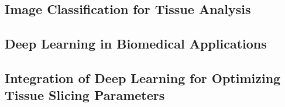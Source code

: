 
\subsection{Image Classification for Tissue Analysis}



\subsection{Deep Learning in Biomedical Applications}


\subsection{Integration of Deep Learning for Optimizing Tissue Slicing Parameters}



\FloatBarrier %








